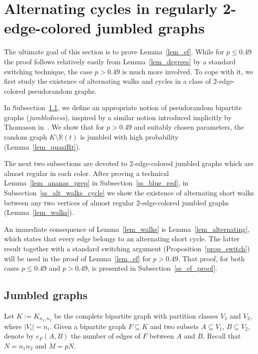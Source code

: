 \documentclass[12pt,reqno]{amsart}
\newcommand{\R} {\mathbb R}
\newcommand{\Knn} {K_{n_1,n_2}}
\theoremstyle{definition}
\begin{document}
\section{Alternating cycles in regularly 2-edge-colored jumbled graphs}
\label{sec_quasi}

The ultimate goal of this section is to prove Lemma~\ref{lem_ef}. While for $p\le0.49$ the proof follows relatively easily from Lemma~\ref{lem_degrees} by a standard switching technique, the case $p > 0.49$ is much more involved. To cope with it, we first study the existence of
alternating walks and cycles in a class of 2-edge-colored pseudorandom graphs.

In Subsection~\ref{ss_jumbled},  we define an appropriate notion of pseudorandom bipartite graphs (\emph{jumbledness}), inspired by a similar notion introduced implicitly by Thomason in~\cite{T89}. We show that for $p > 0.49$ and suitably chosen parameters, the random graph $K\setminus \R(t)$ is jumbled with high probability (Lemma~\ref{lem_quasiRt}).

 The next two subsections are devoted to 2-edge-colored jumbled graphs which are almost regular in each color. After proving a technical Lemma~\ref{lem_ananas_prep} in Subsection~\ref{ss_blue_red}, in Subsection~\ref{ss_alt_walks_cycle} we show the existence of alternating short walks between any two vertices of almost regular 2-edge-colored jumbled graphs (Lemma~\ref{lem_walks}).

 An immediate consequence of Lemma~\ref{lem_walks} is Lemma~\ref{lem_alternating}, which states that every edge belongs to an alternating short cycle. The latter result together with a standard switching argument (Proposition~\ref{prop_switch}) will be used in the proof of  Lemma~\ref{lem_ef} for $p > 0.49$.
 That proof, for both cases $p\le 0.49$ and $p > 0.49$,  is presented in Subsection~\ref{ss_ef_proof}.





\subsection{Jumbled graphs}
\label{ss_jumbled}
Let $K:= \Knn$ be the complete bipartite graph with partition classes $V_1$ and $V_2$, where $|V_i| = n_i$.
Given a bipartite graph $F \subseteq K$ and two subsets $A \subseteq V_1$, $B \subseteq V_2$, denote by $e_F(A,B)$ the number of edges of $F$ between $A$ and $B$.
Recall that $N = n_1n_2$ and $M = pN$.
\end{document}
